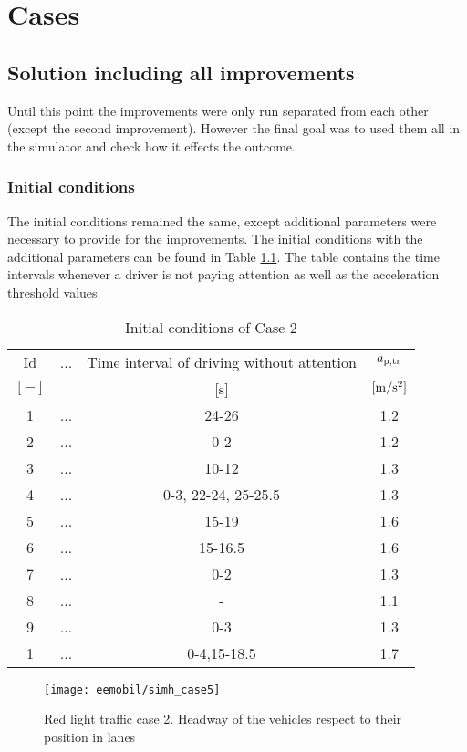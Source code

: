 \chapter{Cases}
		\section{Solution including all improvements}
			Until this point the improvements were only run separated from each other (except the second improvement). However the final goal was to used them all in the simulator and check how it effects the outcome.
			\subsection*{Initial conditions}
			The initial conditions remained the same, except additional parameters were necessary to provide for the improvements. The initial conditions with the additional parameters can be found in Table \ref{tab:new_array}. The table contains the time intervals whenever a driver is not paying attention as well as the acceleration threshold values.
			\begin{table}
				\begin{center}
					\begin{tabular}{ |c|c|c|c| }
						\hline
						Id & ... & Time interval of driving without attention & $a_{\rm p,tr}$\\
						$[-]$ & & [s]& $\rm [m/s^2]$\\
						\hline
						1 & ... & 24-26 & 1.2 \\
						2 & ... & 0-2 & 1.2 \\
						3 & ... & 10-12 & 1.3 \\
						4 & ... & 0-3, 22-24, 25-25.5 & 1.3 \\
						5 & ... & 15-19 & 1.6 \\
						6 & ... & 15-16.5 & 1.6 \\
						7 & ... & 0-2 & 1.3 \\
						8 & ... & - & 1.1 \\
						9 & ... & 0-3 & 1.3 \\
						1 & ... & 0-4,15-18.5 & 1.7 \\
						\hline
					\end{tabular}
				\end{center}
				\caption{Initial conditions of Case 2}
				\label{tab:new_array}
			\end{table}
			\begin{figure}
				\centering
				\texttt{[image: eemobil/simh\_case5]}
				\caption{Red light traffic case 2. Headway of the vehicles respect to their position in lanes}
				\label{fig:red_light_situationh2}
			\end{figure}
